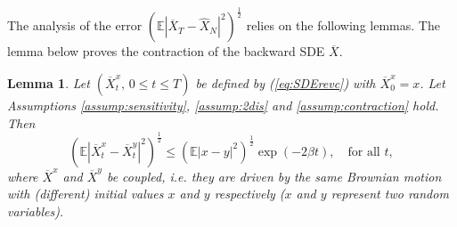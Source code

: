 \documentclass[letterpaper,10pt,reqno]{amsart}
\def\eqref#1{(\ref{#1})}
\newtheorem{lemma}[theorem]{Lemma}
\numberwithin{equation}{section}
\begin{document}
The analysis of the error $\left(\mathbb{E}|\overline{X}_T - \widehat{X}_N|^2\right)^{\frac{1}{2}}$
relies on the following lemmas. 
The lemma below proves the contraction of the backward SDE $\overline{X}$.
\begin{lemma}
\label{lem:contraction}
Let $(\overline{X}^x_t, \, 0 \le t \le T)$
be defined by \eqref{eq:SDErevc} with $\overline{X}^x_0 = x$.
Let Assumptions \ref{assump:sensitivity}, \ref{assump:2dis} and \ref{assump:contraction} hold.
Then
\begin{equation}
\label{eq:contraction}
\left(\mathbb{E}|\overline{X}^x_t - \overline{X}^y_t|^2\right)^{\frac{1}{2}}
\le \left(\mathbb{E}|x - y|^2\right)^{\frac{1}{2}} \exp(- 2 \beta t), \quad \mbox{for all } t,
\end{equation}
where $\overline{X}^x$ and $\overline{X}^y$ be coupled, i.e.
they are driven by the same Brownian motion with (different) initial values $x$ and $y$ respectively ($x$ and $y$ represent two random variables).
\end{lemma}
\end{document}
